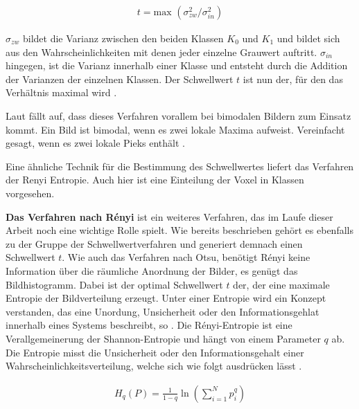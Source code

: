 \begin{align}
	t = \text{max }(\sigma_{zw}^{2}/ \sigma_{in}^{2})
\end{align}

$\sigma_{zw}$ bildet die Varianz zwischen den beiden Klassen $K_{0}$ und $K_{1}$
und bildet sich aus den Wahrscheinlichkeiten mit denen jeder einzelne Grauwert auftritt.
$\sigma_{in}$ hingegen, ist die Varianz innerhalb einer Klasse und entsteht durch
die Addition der Varianzen der einzelnen Klassen. Der Schwellwert $t$ ist nun
der, für den das Verhältnis maximal wird \citep[vgl.][S.~264]{lehmann2013bildverarbeitung}.

Laut \citet[S.~264]{lehmann2013bildverarbeitung} fällt auf, dass dieses
Verfahren vorallem bei bimodalen Bildern zum Einsatz kommt. Ein Bild ist bimodal,
wenn es zwei lokale Maxima aufweist. Vereinfacht gesagt, wenn es zwei lokale
Pieks enthält \citep[vgl.][S.~264]{lehmann2013bildverarbeitung}.

Eine ähnliche Technik für die Bestimmung des Schwellwertes liefert das Verfahren
der Renyi Entropie. Auch hier ist eine Einteilung der Voxel in Klassen
vorgesehen.
\pagebreak

\textbf{Das Verfahren nach Rényi} ist ein weiteres Verfahren, das im Laufe
dieser Arbeit noch eine wichtige Rolle spielt. Wie bereits beschrieben gehört es
ebenfalls zu der Gruppe der Schwellwertverfahren und generiert demnach einen Schwellwert
$t$. Wie auch das Verfahren nach Otsu, benötigt Rényi keine Information über die
räumliche Anordnung der Bilder, es genügt das Bildhistogramm. Dabei ist der optimal
Schwellwert $t$ der, der eine maximale Entropie der Bildverteilung erzeugt. Unter
einer Entropie wird ein Konzept verstanden, das eine Unordung, Unsicherheit oder
den Informationsgehlat innerhalb eines Systems beschreibt, so \citet{bein2006}.
Die Rényi-Entropie ist eine Verallgemeinerung der Shannon-Entropie und hängt von
einem Parameter $q$ ab. Die Entropie misst die Unsicherheit oder den Informationsgehalt
einer Wahrscheinlichkeitsverteilung, welche sich wie folgt ausdrücken lässt
\citep[vgl.][K. 2]{bromiley2004}.

\begin{align}
	\label{equ:renyi}H_{q}(P) = \frac{1}{1-q}\ln \left( \sum_{i=1}^{N}p_{i}^{q}\right)
\end{align}

